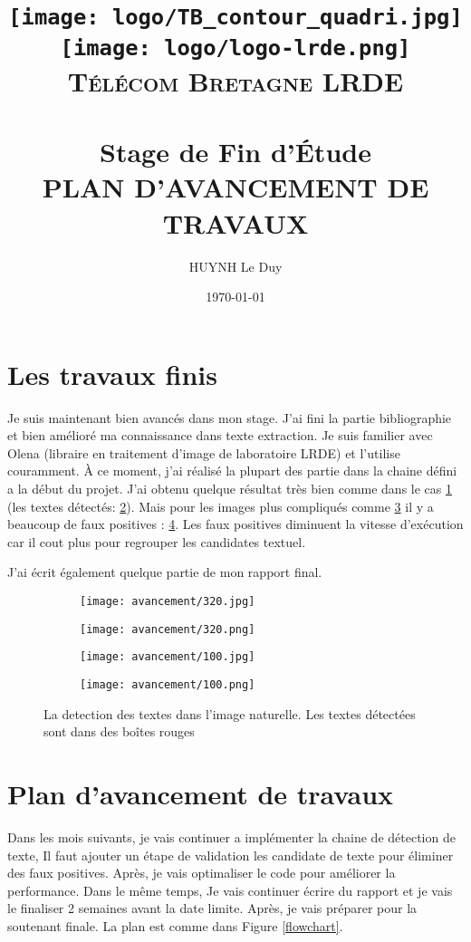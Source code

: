 \documentclass[12pt,a4paper]{article}
\title{	
\normalfont \normalsize
\hspace{1.5 cm}
\texttt{[image: logo/TB\_contour\_quadri.jpg]}
\hspace{10 cm}
\texttt{[image: logo/logo-lrde.png]} \\ [2pt]
\textsc{Télécom Bretagne} 
\hspace{9.5 cm}
\textsc{LRDE} \\ [25pt] %
\horrule{0.5pt} \\[0.4cm] %
\huge Stage de Fin d'Étude \\ %
\textsc{PLAN D'AVANCEMENT DE TRAVAUX}
\horrule{2pt} \\[0.5cm] %
}
\author{HUYNH Le Duy} %
\date{\normalsize\today} %
\begin{document}
\maketitle %
\section{Les travaux finis}
Je suis maintenant bien avancés dans mon stage. J'ai fini la partie bibliographie et bien amélioré ma connaissance dans texte extraction. Je suis familier avec Olena (libraire en traitement d'image de laboratoire LRDE) et l'utilise couramment. À ce moment, j'ai réalisé la plupart des partie dans la chaine défini a la début du projet. J'ai obtenu quelque résultat très bien comme dans le cas \ref{ori} (les textes détectés: \ref{text}). 
Mais pour les images plus compliqués comme \ref{ori2} il y a  beaucoup de faux positives : \ref{text2}. Les faux positives diminuent la vitesse d'exécution car il cout plus pour regrouper les candidates textuel.

J'ai écrit également quelque partie de mon rapport final.
\begin{figure}
        \centering
        \begin{subfigure}[b]{0.3\textwidth}
                \texttt{[image: avancement/320.jpg]}
                \caption{}
                \label{ori}
        \end{subfigure}
        \begin{subfigure}[b]{0.3\textwidth}
                \texttt{[image: avancement/320.png]}
                \caption{}
                \label{text}
        \end{subfigure}
        
        
        \begin{subfigure}[b]{0.3\textwidth}
                \texttt{[image: avancement/100.jpg]}
                \caption{}
                \label{ori2}
        \end{subfigure}
        \begin{subfigure}[b]{0.3\textwidth}
                \texttt{[image: avancement/100.png]}
                \caption{}
                \label{text2}
        \end{subfigure}        
        \caption{La detection des textes dans l'image naturelle. Les textes détectées sont dans des boîtes rouges}\label{textDetection}
\end{figure}
\section{Plan d'avancement de travaux}
Dans les mois suivants, je vais continuer a implémenter la chaine de détection de texte, Il faut ajouter un étape de validation les candidate de texte pour éliminer des faux positives. Après, je vais optimaliser le code pour améliorer la performance. Dans le même temps, Je vais continuer écrire du rapport et je vais le finaliser 2 semaines avant la date limite. Après, je vais préparer pour la soutenant finale. La plan est comme dans Figure \ref{flowchart}.
\end{document}
